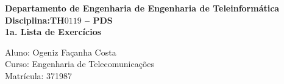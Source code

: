 \documentclass[a4paper,12pt]{article}
\begin{document}
{
%
     {\sf
       \vspace*{4cm}
      \begin{center}
         {\Large {\bfseries Departamento de Engenharia de Engenharia de Teleinformática}}\\
         \vspace*{1.0cm}
         {\Large{\bfseries Disciplina:TH$0119$ -- PDS}}\\
         \vspace*{1.0cm}
         {\large{\bfseries 1a. Lista de Exercícios}}
     \end{center}
 \vspace*{12.0cm}
    {\Large
        \begin{flushleft}
	       \noindent Aluno: Ogeniz Façanha Costa\\
	       Curso: Engenharia de Telecomunicações\\
	       Matrícula: 371987\\
        \end{flushleft}}
    }
%
\newpage
%

}
%


%
\end{document}
